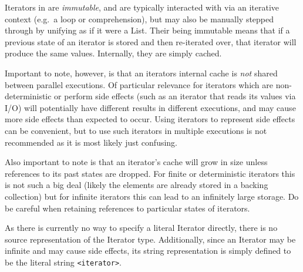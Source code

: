 Iterators in \Trilogy{} are \emph{immutable}, and are typically interacted
with via an iterative context (e.g.\ a  loop or comprehension), but
may also be manually stepped through by unifying as if it were a List. Their
being immutable means that if a previous state of an iterator is stored and then
re-iterated over, that iterator will produce the same values. Internally, they
are simply cached.

Important to note, however, is that an iterators internal cache is \emph{not}
shared between parallel executions. Of particular relevance for iterators which
are non-deterministic or perform side effects (such as an iterator that reads
its values via I/O) will potentially have different results in different executions,
and may cause more side effects than expected to occur. Using iterators to
represent side effects can be convenient, but to use such iterators in multiple
executions is not recommended as it is most likely just confusing.

Also important to note is that an iterator's cache will grow in size unless
references to its past states are dropped. For finite or deterministic iterators
this is not such a big deal (likely the elements are already stored in a backing
collection) but for infinite iterators this can lead to an infinitely large
storage. Do be careful when retaining references to particular states of iterators.

As there is currently no way to specify a literal Iterator directly, there is no
source representation of the Iterator type. Additionally, since an Iterator
may be infinite and may cause side effects, its string representation is simply
defined to be the literal string \texttt{<iterator>}.
